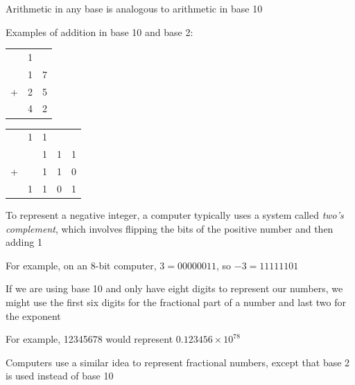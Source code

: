 \documentclass[8pt,a4paper,compress]{beamer}
\begin{document}
\begin{frame}[fragile]
Arithmetic in any base is analogous to arithmetic in base 10

\bigskip

Examples of addition in base 10 and base 2:
\begin{center}

\begin{tabular}{ccc}
  & 1 &   \\ 
  & 1 & 7 \\
+ & 2 & 5 \\
\hline
  & 4 & 2 \\
\end{tabular}\hspace{2cm} \begin{tabular}{ccccc}
  & 1 & 1 &   \\ 
  &   & 1 & 1 & 1 \\
+ &   & 1 & 1 & 0 \\
\hline
  & 1 & 1 & 0 & 1 \\
\end{tabular}
\end{center}

\bigskip

To represent a negative integer, a computer typically uses a system called \emph{two's complement}, which involves flipping the bits of the positive number and then adding 1

\bigskip

For example, on an 8-bit computer, $3 = 00000011$, so $-3 = 11111101$
\end{frame}

\begin{frame}[fragile]
If we are using base 10 and only have eight digits to represent our numbers, we might use the first six digits for the fractional part of a number and last two for the exponent  

\bigskip

For example, 12345678 would represent $0.123456 \times 10^{78}$

\bigskip

Computers use a similar idea to represent fractional numbers, except that base 2 is used instead of base 10
\end{frame}
\end{document}
